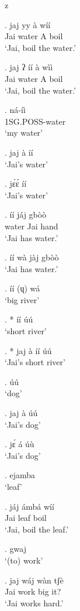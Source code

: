 z   \documentclass{assets/fieldnotes}
\begin{document}

\exg. jaj yy à wíí\\
Jai water A boil \\
`Jai, boil the water.'


\exg. jaj ʔ íí à wìì \\
Jai {} water A boil \\
`Jai, boil the water.'

\exg. ná-íì \\ 
1SG.POSS-water \\
`my water'


\ex. jaj à íí\\
`Jai's water'


\ex. jɛ́ɛ́ íí \\
`Jai's water'

\exg. íí jáj gbòò \\
water Jai hand \\
`Jai has water.'

\ex. íí wà jàj gbòò \\
`Jai has water.'

\ex. íí (ɥ) wá\\
`big river'

\ex. * íí úú \\
`short river'

\ex. * jaj à íí úú \\
`Jai's short river'

\ex. úú \\
`dog'

\ex. jaj à úú \\
`Jai's dog'

\ex. jɛ́ á úù \\
`Jai's dog'


\ex. ejamba \\
`leaf'

\exg. jáj ámbá wíí \\
Jai leaf boil \\
`Jai, boil the leaf.'

\ex. gwaj \\
`(to) work'

\ex. jaj wáj wàn tʃè \\
Jai work big it? \\
`Jai works hard.'
\end{document}
